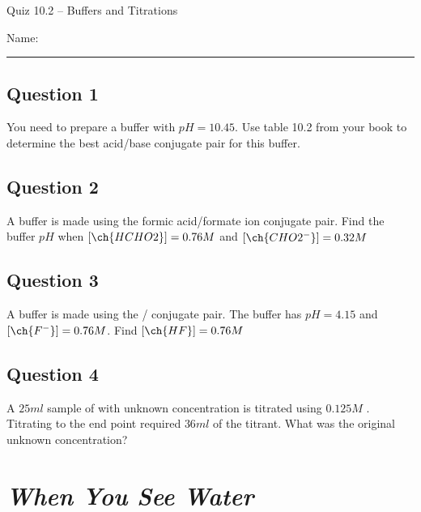 \documentclass[11pt, letterpaper]{memoir}
\begin{document}
	\begin{center}
		{\large Quiz 10.2 -- Buffers and Titrations}
	\end{center}
	{\large Name: \rule[-1mm]{4in}{.1pt} 

\subsection*{Question 1}
You need to prepare a buffer with $pH=10.45$. Use table 10.2 from your book to determine the best acid/base conjugate pair for this buffer.

\vspace{3em}
\subsection*{Question 2}
A buffer is made using the formic acid/formate ion conjugate pair. Find the buffer $pH$ when $\left[\ch{HCHO2}\right]=0.76M$ and $\left[\ch{CHO2^-}\right]=0.32M$

\vspace{9em}
\subsection*{Question 3}
A buffer is made using the / conjugate pair. The buffer has $pH=4.15$ and $\left[\ch{F^-}\right]=0.76M$. Find $\left[\ch{HF}\right]=0.76M$

\vspace{9em}
\subsection*{Question 4}
A $25ml$ sample of  with unknown concentration is titrated using $0.125M$ . Titrating to the end point required $36ml$ of the  titrant. What was the original unknown concentration?

\newpage
{}
\pagestyle{empty}
\addtocounter{page}{-1}
\section*{\emph{When You See Water}}
}
\end{document}
